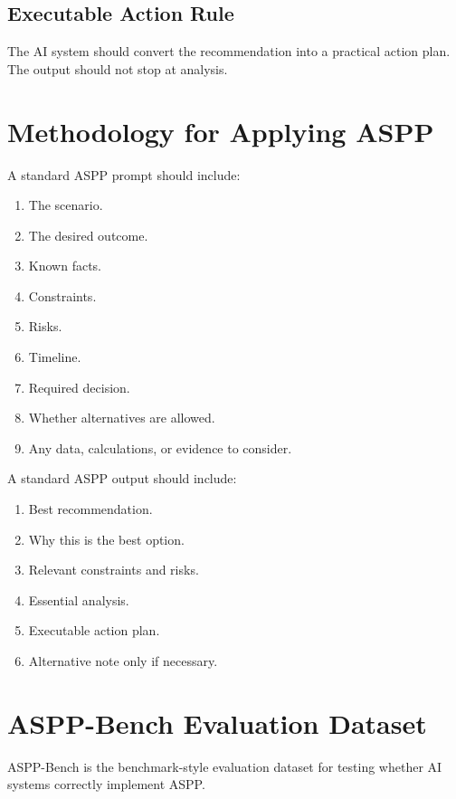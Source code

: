 \documentclass[11pt]{article}
\begin{document}
\subsection{Executable Action Rule}

The AI system should convert the recommendation into a practical action plan. The output should not stop at analysis.

\section{Methodology for Applying ASPP}

A standard ASPP prompt should include:

\begin{enumerate}[leftmargin=*]
    \item The scenario.
    \item The desired outcome.
    \item Known facts.
    \item Constraints.
    \item Risks.
    \item Timeline.
    \item Required decision.
    \item Whether alternatives are allowed.
    \item Any data, calculations, or evidence to consider.
\end{enumerate}

A standard ASPP output should include:

\begin{enumerate}[leftmargin=*]
    \item Best recommendation.
    \item Why this is the best option.
    \item Relevant constraints and risks.
    \item Essential analysis.
    \item Executable action plan.
    \item Alternative note only if necessary.
\end{enumerate}

\section{ASPP-Bench Evaluation Dataset}

ASPP-Bench is the benchmark-style evaluation dataset for testing whether AI systems correctly implement ASPP.
\end{document}
